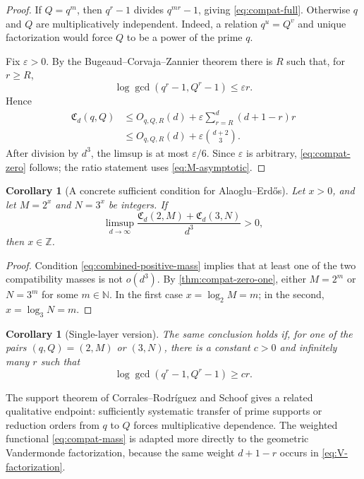 \documentclass[11pt]{article}
\newtheorem{corollary}[theorem]{Corollary}
\theoremstyle{definition}
\theoremstyle{remark}
\newcommand{\N}{\mathbb N}
\newcommand{\Z}{\mathbb Z}
\newcommand{\AEname}{Alaoglu--Erd\H{o}s}
\begin{document}
\begin{proof}
If $Q=q^m$, then $q^r-1$ divides $q^{mr}-1$, giving
\eqref{eq:compat-full}.  Otherwise $q$ and $Q$ are multiplicatively
independent.  Indeed, a relation $q^u=Q^v$ and unique factorization would
force $Q$ to be a power of the prime $q$.

Fix $\varepsilon>0$.  By the Bugeaud--Corvaja--Zannier theorem there is $R$
such that, for $r\geq R$,
\[
 \log\gcd(q^r-1,Q^r-1)\leq\varepsilon r.
\]
Hence
\begin{align*}
 \mathfrak C_d(q,Q)
 &\leq O_{q,Q,R}(d)
   +\varepsilon\sum_{r=R}^{d}(d+1-r)r\\
 &\leq O_{q,Q,R}(d)+\varepsilon\binom{d+2}{3}.
\end{align*}
After division by $d^3$, the limsup is at most $\varepsilon/6$.  Since
$\varepsilon$ is arbitrary, \eqref{eq:compat-zero} follows; the ratio statement
uses \eqref{eq:M-asymptotic}.
\end{proof}

\begin{corollary}[A concrete sufficient condition for \AEname]
\label{cor:compat-AE}
Let $x>0$, and let $M=2^x$ and $N=3^x$ be integers.  If
\begin{equation}\label{eq:combined-positive-mass}
 \limsup_{d\to\infty}
 \frac{\mathfrak C_d(2,M)+\mathfrak C_d(3,N)}{d^3}>0,
\end{equation}
then $x\in\Z$.
\end{corollary}

\begin{proof}
Condition \eqref{eq:combined-positive-mass} implies that at least one of the
two compatibility masses is not $o(d^3)$.  By
\cref{thm:compat-zero-one}, either $M=2^m$ or $N=3^m$ for some
$m\in\N$.  In the first case $x=\log_2 M=m$; in the second,
$x=\log_3 N=m$.
\end{proof}

\begin{corollary}[Single-layer version]\label{cor:single-layer}
The same conclusion holds if, for one of the pairs $(q,Q)=(2,M)$ or $(3,N)$,
there is a constant $c>0$ and infinitely many $r$ such that
\[
 \log\gcd(q^r-1,Q^r-1)\geq c r.
\]
\end{corollary}

The support theorem of Corrales--Rodr\'{i}guez and Schoof
\cite{CorralesSchoof1997} gives a related qualitative endpoint: sufficiently
systematic transfer of prime supports or reduction orders from $q$ to $Q$
forces multiplicative dependence.  The weighted functional
\eqref{eq:compat-mass} is adapted more directly to the geometric Vandermonde
factorization, because the same weight $d+1-r$ occurs in
\eqref{eq:V-factorization}.
\end{document}
